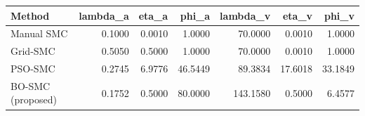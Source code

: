 \begin{tabular}{lrrrrrr}
\toprule
Method & lambda_a & eta_a & phi_a & lambda_v & eta_v & phi_v \\
\midrule
Manual SMC & 0.1000 & 0.0010 & 1.0000 & 70.0000 & 0.0010 & 1.0000 \\
Grid-SMC & 0.5050 & 0.5000 & 1.0000 & 70.0000 & 0.0010 & 1.0000 \\
PSO-SMC & 0.2745 & 6.9776 & 46.5449 & 89.3834 & 17.6018 & 33.1849 \\
BO-SMC (proposed) & 0.1752 & 0.5000 & 80.0000 & 143.1580 & 0.5000 & 6.4577 \\
\bottomrule
\end{tabular}
